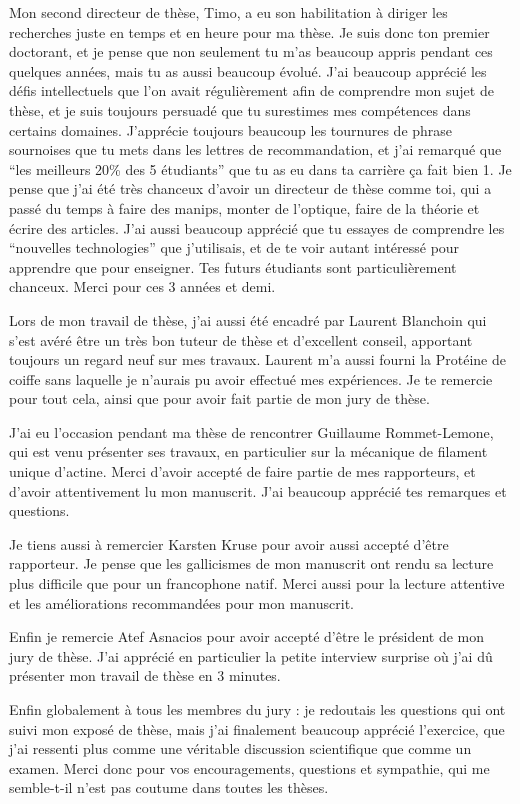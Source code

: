 \documentclass[A4paperpaper,11pt,english]{sphinxmanual}
\begin{document}
Mon second directeur de thèse, Timo, a eu son habilitation à diriger les
recherches juste en temps et en heure pour ma thèse. Je suis donc ton premier
doctorant, et je pense que non seulement tu m'as beaucoup appris pendant ces
quelques années, mais tu as aussi beaucoup évolué. J'ai beaucoup apprécié les
défis intellectuels que l'on avait régulièrement afin de comprendre mon sujet
de thèse, et je suis toujours persuadé que tu surestimes mes compétences dans
certains domaines. J'apprécie toujours beaucoup les tournures de phrase sournoises
que tu mets dans les lettres de recommandation, et j'ai remarqué que ``les
meilleurs 20\% des 5 étudiants'' que tu as eu dans ta carrière ça fait bien 1.
Je pense que j'ai été très chanceux d'avoir un directeur de thèse comme toi,
qui a passé du temps à faire des manips, monter de l'optique, faire de la
théorie et écrire des articles. J'ai aussi beaucoup apprécié que tu essayes de
comprendre les ``nouvelles technologies'' que j'utilisais, et de te voir autant
intéressé pour apprendre que pour enseigner. Tes futurs étudiants sont
particulièrement chanceux. Merci pour ces 3 années et demi.

Lors de mon travail de thèse, j'ai aussi été encadré par Laurent Blanchoin
qui s'est avéré être un très bon tuteur de thèse et d'excellent conseil,
apportant toujours un regard neuf sur mes travaux. Laurent m'a aussi fourni la
Protéine de coiffe sans laquelle je n'aurais pu avoir effectué mes
expériences. Je te remercie pour tout cela, ainsi que pour avoir fait partie de
mon jury de thèse.

J'ai eu l'occasion pendant ma thèse de rencontrer Guillaume Rommet-Lemone, qui
est venu présenter ses travaux, en particulier sur la mécanique de filament
unique d'actine. Merci d'avoir accepté de faire partie de mes rapporteurs, et
d'avoir attentivement lu mon manuscrit. J'ai beaucoup apprécié tes remarques
et questions.

Je tiens aussi à remercier Karsten Kruse pour avoir aussi accepté d'être
rapporteur. Je pense que les gallicismes de mon manuscrit ont rendu sa lecture
plus difficile que pour un francophone natif. Merci aussi pour la lecture attentive
et les améliorations recommandées pour mon manuscrit.

Enfin je remercie Atef Asnacios pour avoir accepté d'être le président de mon
jury de thèse. J'ai apprécié en particulier la petite interview surprise où
j'ai dû présenter mon travail de thèse en 3 minutes.

Enfin globalement à tous les membres du jury : je redoutais les questions qui
ont suivi mon exposé de thèse, mais j'ai finalement beaucoup apprécié
l'exercice, que j'ai ressenti plus comme une véritable discussion scientifique
que comme un examen. Merci donc pour vos encouragements, questions et sympathie,
qui me semble-t-il n'est pas coutume dans toutes les thèses.
\end{document}
